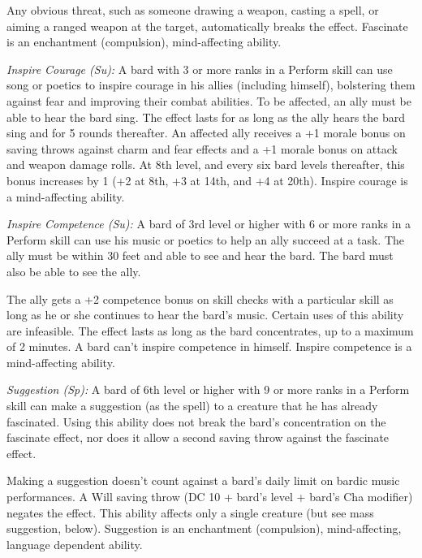 Any obvious threat, such as someone drawing a weapon, casting a spell, or aiming a ranged weapon at the target, automatically breaks the effect. Fascinate is an enchantment (compulsion), mind-affecting ability.

\textit{Inspire Courage (Su):} A bard with 3 or more ranks in a Perform skill can use song or poetics to inspire courage in his allies (including himself), bolstering them against fear and improving their combat abilities. To be affected, an ally must be able to hear the bard sing. The effect lasts for as long as the ally hears the bard sing and for 5 rounds thereafter. An affected ally receives a +1 morale bonus on saving throws against charm and fear effects and a +1 morale bonus on attack and weapon damage rolls. At 8th level, and every six bard levels thereafter, this bonus increases by 1 (+2 at 8th, +3 at 14th, and +4 at 20th). Inspire courage is a mind-affecting ability.

\textit{Inspire Competence (Su):} A bard of 3rd level or higher with 6 or more ranks in a Perform skill can use his music or poetics to help an ally succeed at a task. The ally must be within 30 feet and able to see and hear the bard. The bard must also be able to see the ally.

The ally gets a +2 competence bonus on skill checks with a particular skill as long as he or she continues to hear the bard's music. Certain uses of this ability are infeasible. The effect lasts as long as the bard concentrates, up to a maximum of 2 minutes. A bard can't inspire competence in himself. Inspire competence is a mind-affecting ability.

\textit{Suggestion (Sp):} A bard of 6th level or higher with 9 or more ranks in a Perform skill can make a suggestion (as the spell) to a creature that he has already fascinated. Using this ability does not break the bard's concentration on the fascinate effect, nor does it allow a second saving throw against the fascinate effect.

Making a suggestion doesn't count against a bard's daily limit on bardic music performances. A Will saving throw (DC 10 + \onehalf bard's level + bard's Cha modifier) negates the effect. This ability affects only a single creature (but see mass suggestion, below). Suggestion is an enchantment (compulsion), mind-affecting, language dependent ability.

